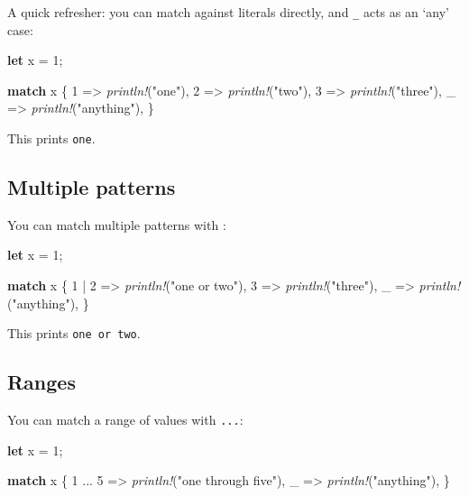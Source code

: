 \documentclass[a4paper,]{book}
\newenvironment{Shaded}{\begin{snugshade}}{\end{snugshade}}
\newcommand{\KeywordTok}[1]{\textcolor[rgb]{0.13,0.29,0.53}{\textbf{{#1}}}}
\newcommand{\DecValTok}[1]{\textcolor[rgb]{0.00,0.00,0.81}{{#1}}}
\newcommand{\StringTok}[1]{\textcolor[rgb]{0.31,0.60,0.02}{{#1}}}
\newcommand{\PreprocessorTok}[1]{\textcolor[rgb]{0.56,0.35,0.01}{\textit{{#1}}}}
\newcommand{\NormalTok}[1]{{#1}}
\begin{document}
A quick refresher: you can match against literals directly, and
\texttt{\_} acts as an `any' case:

\begin{Shaded}
\begin{Highlighting}[]
\KeywordTok{let} \NormalTok{x = }\DecValTok{1}\NormalTok{;}

\KeywordTok{match} \NormalTok{x \{}
    \DecValTok{1} \NormalTok{=> }\PreprocessorTok{println!}\NormalTok{(}\StringTok{"one"}\NormalTok{),}
    \DecValTok{2} \NormalTok{=> }\PreprocessorTok{println!}\NormalTok{(}\StringTok{"two"}\NormalTok{),}
    \DecValTok{3} \NormalTok{=> }\PreprocessorTok{println!}\NormalTok{(}\StringTok{"three"}\NormalTok{),}
    \NormalTok{_ => }\PreprocessorTok{println!}\NormalTok{(}\StringTok{"anything"}\NormalTok{),}
\NormalTok{\}}
\end{Highlighting}
\end{Shaded}

This prints \texttt{one}.

\subsection{Multiple patterns}\label{multiple-patterns}

You can match multiple patterns with \texttt{\textbar{}}:

\begin{Shaded}
\begin{Highlighting}[]
\KeywordTok{let} \NormalTok{x = }\DecValTok{1}\NormalTok{;}

\KeywordTok{match} \NormalTok{x \{}
    \DecValTok{1} \NormalTok{| }\DecValTok{2} \NormalTok{=> }\PreprocessorTok{println!}\NormalTok{(}\StringTok{"one or two"}\NormalTok{),}
    \DecValTok{3} \NormalTok{=> }\PreprocessorTok{println!}\NormalTok{(}\StringTok{"three"}\NormalTok{),}
    \NormalTok{_ => }\PreprocessorTok{println!}\NormalTok{(}\StringTok{"anything"}\NormalTok{),}
\NormalTok{\}}
\end{Highlighting}
\end{Shaded}

This prints \texttt{one\ or\ two}.

\subsection{Ranges}\label{ranges}

You can match a range of values with \texttt{...}:

\begin{Shaded}
\begin{Highlighting}[]
\KeywordTok{let} \NormalTok{x = }\DecValTok{1}\NormalTok{;}

\KeywordTok{match} \NormalTok{x \{}
    \DecValTok{1} \NormalTok{... }\DecValTok{5} \NormalTok{=> }\PreprocessorTok{println!}\NormalTok{(}\StringTok{"one through five"}\NormalTok{),}
    \NormalTok{_ => }\PreprocessorTok{println!}\NormalTok{(}\StringTok{"anything"}\NormalTok{),}
\NormalTok{\}}
\end{Highlighting}
\end{Shaded}
\end{document}
